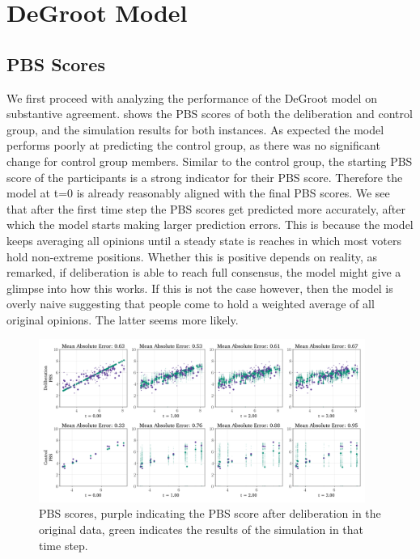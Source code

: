 \section{DeGroot Model} \label{degroot_results} \subsection{PBS Scores} We
first proceed with analyzing the performance of the DeGroot model on
substantive agreement.  shows the PBS scores of both the
deliberation and control group, and the simulation results for both instances.
As expected the model performs poorly at predicting the control group, as
there was no significant change for control group members. Similar to the
control group, the starting PBS score of the participants is a strong
indicator for their PBS score. Therefore the model at t=0 is already
reasonably aligned with the final PBS scores. We see that after the first time
step the PBS scores get predicted more accurately, after which the model
starts making larger prediction errors. This is because the model keeps
averaging all opinions until a steady state is reaches in which most voters
hold non-extreme positions. Whether this is positive depends on
reality, as \citet{elsterMarketForumThree2002} remarked, if deliberation is
able to reach full consensus, the model might give a glimpse into how this
works. If this is not the case however, then the model is overly naive
suggesting that people come to hold a weighted average of all original
opinions. The latter seems more likely.


\begin{figure}
	\begin{center}
		\includegraphics[width=0.95\textwidth]{Figures/pbs_scores.png}
	\end{center}
	\caption{PBS scores, purple indicating the PBS score after deliberation in the original data, green indicates the results of the simulation in that time step.}\label{fig:pbs}
\end{figure}


